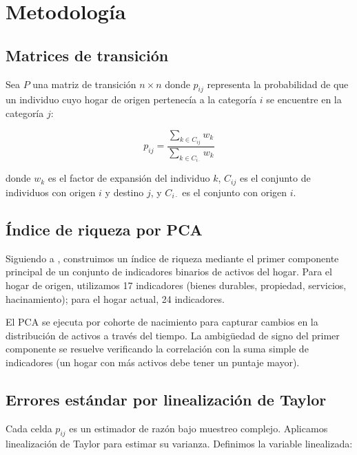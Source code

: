 \documentclass[12pt, a4paper]{article}
\begin{document}
\section{Metodología}
\label{sec:method}

\subsection{Matrices de transición}

Sea $P$ una matriz de transición $n \times n$ donde $p_{ij}$ representa la probabilidad de que un individuo cuyo hogar de origen pertenecía a la categoría $i$ se encuentre en la categoría $j$:

\begin{equation}
    p_{ij} = \frac{\sum_{k \in C_{ij}} w_k}{\sum_{k \in C_{i \cdot}} w_k}
    \label{eq:transition}
\end{equation}

donde $w_k$ es el factor de expansión del individuo $k$, $C_{ij}$ es el conjunto de individuos con origen $i$ y destino $j$, y $C_{i\cdot}$ es el conjunto con origen $i$.

\subsection{Índice de riqueza por PCA}
\label{subsec:pca}

Siguiendo a \citet{filmer2001}, construimos un índice de riqueza mediante el primer componente principal de un conjunto de indicadores binarios de activos del hogar. Para el hogar de origen, utilizamos 17 indicadores (bienes durables, propiedad, servicios, hacinamiento); para el hogar actual, 24 indicadores.

El PCA se ejecuta por cohorte de nacimiento para capturar cambios en la distribución de activos a través del tiempo. La ambigüedad de signo del primer componente se resuelve verificando la correlación con la suma simple de indicadores (un hogar con más activos debe tener un puntaje mayor).

\subsection{Errores estándar por linealización de Taylor}
\label{subsec:taylor}

Cada celda $p_{ij}$ es un estimador de razón bajo muestreo complejo. Aplicamos linealización de Taylor \citep{binder1983, wolter2007} para estimar su varianza. Definimos la variable linealizada:
\end{document}
